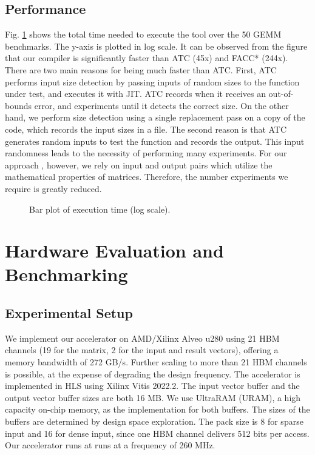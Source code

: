 \documentclass[manuscript,screen,review]{acmart}
\begin{document}
\subsection{Performance}

Fig. \ref{fig:execution-times} shows the total time needed to execute the tool over the 50 GEMM benchmarks. The y-axis is plotted in log scale. It can be observed from the figure that our compiler is significantly faster than ATC (45x) and FACC* (244x). There are two main reasons for being much faster than ATC. First, ATC performs input size detection by passing inputs of random sizes to the function under test, and executes it with JIT. ATC records when it receives an out-of-bounds error, and experiments until it detects the correct size. On the other hand, we perform size detection using a single replacement pass on a copy of the code, which records the input sizes in a file. The second reason is that ATC generates random inputs to test the function and records the output. This input randomness leads to the necessity of performing many experiments. For our approach , however, we rely on input and output pairs which utilize the mathematical properties of matrices. Therefore, the number experiments we require is greatly reduced.

\begin{figure}[h!]
	\centering
	\caption{Bar plot of execution time (log scale).}
	\label{fig:execution-times}
\end{figure}


\section{ Hardware Evaluation and Benchmarking}

\subsection{Experimental Setup}
We implement our accelerator on AMD/Xilinx Alveo u280 using 21 HBM channels (19 for the matrix, 2 for the input and result vectors), offering a memory bandwidth of 272 GB/s. Further scaling to more than 21 HBM channels is possible, at the expense of degrading the design frequency. The accelerator is implemented in HLS using Xilinx Vitis \cite{Vitis} 2022.2.
The input vector buffer and the output vector buffer sizes are both 16 MB. We use UltraRAM (URAM), a high capacity on-chip memory, as the implementation for both buffers. The sizes of the buffers are determined by design space exploration. The pack size is 8 for sparse input and 16 for dense input, since one HBM channel delivers 512 bits per access. Our accelerator runs at runs at a frequency of 260 MHz. 
\end{document}
